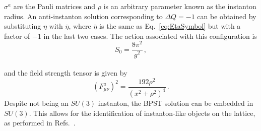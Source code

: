 %
$\sigma^a$ are the Pauli matrices and $\rho$ is an arbitrary parameter known as the instanton radius. An anti-instanton solution corresponding to $\Delta Q=-1$ can be obtained by substituting $\eta$ with $\bar{\eta}$, where $\bar{\eta}$ is the same as Eq.~\ref{eq:EtaSymbol} but with a factor of $-1$ in the last two cases. The action associated with this configuration is 
%
\begin{equation}
S_0 = \frac{8\pi^2}{g^2}\, ,
\end{equation}\\
%
and the field strength tensor is given by~\cite{Schafer:1996wv}
%
\begin{equation}
\left(F_{\mu\nu}^a\right)^2 = \frac{192\rho^2}{\left(x^2+\rho^2\right)^4}\, .
\label{eq:InstantonFieldStrength}
\end{equation}
%
Despite not being an $SU(3)$ instanton, the BPST solution can be embedded in $SU(3)$. This allows for the identification of instanton-like objects on the lattice, as performed in Refs.~\cite{Trewartha:2015ida,Moran:2008qd}.


